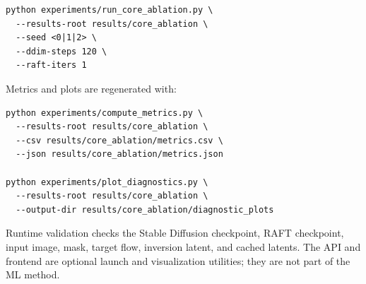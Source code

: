 \begin{verbatim}
python experiments/run_core_ablation.py \
  --results-root results/core_ablation \
  --seed <0|1|2> \
  --ddim-steps 120 \
  --raft-iters 1
\end{verbatim}

Metrics and plots are regenerated with:

\begin{verbatim}
python experiments/compute_metrics.py \
  --results-root results/core_ablation \
  --csv results/core_ablation/metrics.csv \
  --json results/core_ablation/metrics.json

python experiments/plot_diagnostics.py \
  --results-root results/core_ablation \
  --output-dir results/core_ablation/diagnostic_plots
\end{verbatim}

Runtime validation checks the Stable Diffusion checkpoint, RAFT checkpoint, input image, mask, target flow, inversion latent, and cached latents. The API and frontend are optional launch and visualization utilities; they are not part of the ML method.

\FloatBarrier
